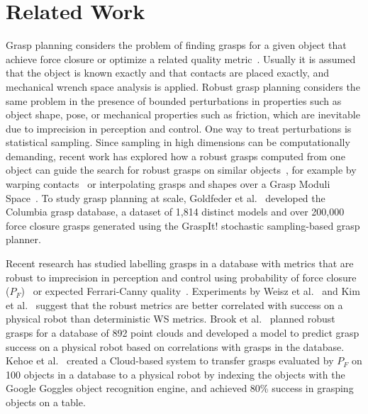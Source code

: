 \section{Related Work}

Grasp planning considers the problem of finding grasps for a given object that achieve force closure or optimize a related quality metric~\cite{pokorny2013c}.
Usually it is assumed that the object is known exactly and that contacts are placed exactly, and mechanical wrench space analysis is applied.
Robust grasp planning considers the same problem in the presence of bounded perturbations in properties such as object shape, pose, or mechanical properties such as friction, which are inevitable due to imprecision in perception and control.
One way to treat perturbations is statistical sampling.
Since sampling in high dimensions can be computationally demanding, recent work has explored how a robust grasps computed from one object can guide the search for robust grasps on similar objects~\cite{bohg2014data}, for example by warping contacts~\cite{stouraitis2015functional} or interpolating grasps and shapes over a Grasp Moduli Space~\cite{pokorny2013grasp}.
To study grasp planning at scale, Goldfeder et al.~\cite{goldfeder2009columbia, goldfeder2011data} developed the Columbia grasp database, a dataset of 1,814 distinct models and over 200,000 force closure grasps generated using the GraspIt! stochastic sampling-based grasp planner.

Recent research has studied labelling grasps in a database with metrics that are robust to imprecision in perception and control using probability of force closure ($P_F$)~\cite{weisz2012pose} or expected Ferrari-Canny quality~\cite{kim2012physically}.
Experiments by Weisz et al.~\cite{weisz2012pose} and Kim et al.~\cite{kim2012physically} suggest that the robust metrics are better correlated with success on a physical robot than deterministic WS metrics.
Brook et al.~\cite{brook2011collaborative} planned robust grasps for a database of 892 point clouds and developed a model to predict grasp success on a physical robot based on correlations with grasps in the database.   
Kehoe et al.~\cite{kehoe2013cloud} created a Cloud-based system to transfer grasps evaluated by $P_F$ on 100 objects in a database to a physical robot by indexing the objects with the Google Goggles object recognition engine, and achieved 80\% success in grasping objects on a table.

